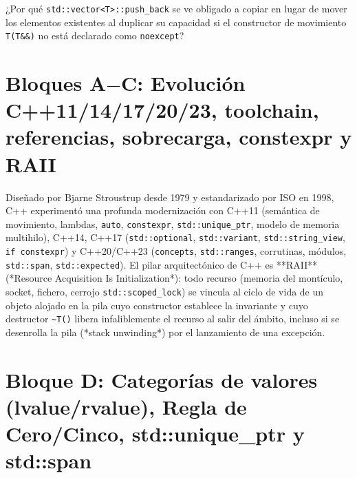 \documentclass{book}
\begin{document}
\begin{tcolorbox}[title={Autoficha}, studiumcheck, breakable]

¿Por qué \texttt{std::vector<T>::push\_back} se ve obligado a copiar en lugar de mover los elementos existentes al duplicar su capacidad si el constructor de movimiento \texttt{T(T\&\&)} no está declarado como \texttt{noexcept}?
\end{tcolorbox}

\section{Bloques A\(-\)C: Evolución C++11/14/17/20/23, toolchain, referencias, sobrecarga, constexpr y RAII}

Diseñado por Bjarne Stroustrup desde 1979 y estandarizado por ISO en 1998, C++ experimentó una profunda modernización con C++11 (semántica de movimiento, lambdas, \texttt{auto}, \texttt{constexpr}, \texttt{std::unique\_ptr}, modelo de memoria multihilo), C++14, C++17 (\texttt{std::optional}, \texttt{std::variant}, \texttt{std::string\_view}, \texttt{if constexpr}) y C++20/C++23 (\texttt{concepts}, \texttt{std::ranges}, corrutinas, módulos, \texttt{std::span}, \texttt{std::expected}). El pilar arquitectónico de C++ es **RAII** (*Resource Acquisition Is Initialization*): todo recurso (memoria del montículo, socket, fichero, cerrojo \texttt{std::scoped\_lock}) se vincula al ciclo de vida de un objeto alojado en la pila cuyo constructor establece la invariante y cuyo destructor \texttt{\textasciitilde{}T()} libera infaliblemente el recurso al salir del ámbito, incluso si se desenrolla la pila (*stack unwinding*) por el lanzamiento de una excepción.

\section{Bloque D: Categorías de valores (lvalue/rvalue), Regla de Cero/Cinco, std::unique\_ptr y std::span}
\end{document}
